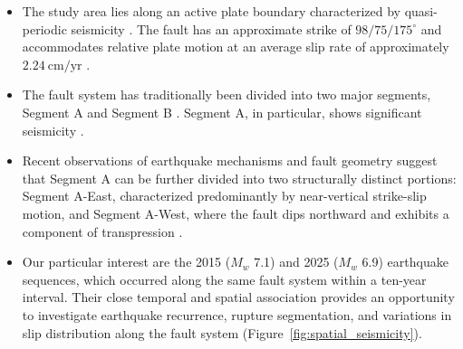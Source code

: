 \begin{itemize}


    \item The study area lies along an active plate boundary characterized by quasi-periodic seismicity \cite{Aderhold2016}. The fault has an approximate 
    strike of $98/75/175^\circ$ and accommodates relative plate motion at an average slip rate of approximately $2.24~\mathrm{cm/yr}$ \cite{Aderhold2016,DeMets1990}.

    \item The fault system has traditionally been divided into two major segments, Segment A and Segment B \cite{Searle1981,Whitmarsh1986,Skolotnev2021}.
     Segment A, in particular, shows significant seismicity \cite{Aderhold2016}.

    \item Recent observations of earthquake mechanisms and fault geometry suggest that Segment A can be further divided into two structurally distinct portions: 
    Segment A-East, characterized predominantly by near-vertical strike-slip motion, and Segment A-West, where the fault dips northward and exhibits a component
     of transpression \cite{Janin2026}.

    \item Our particular interest are the 2015 ($M_w$ 7.1) and 2025 ($M_w$ 6.9) earthquake sequences, which occurred along the same fault system within a ten-year interval. Their close 
    temporal and spatial association provides an opportunity to investigate earthquake recurrence, rupture segmentation, and variations in slip distribution along 
    the fault system (Figure~\ref{fig:spatial_seismicity}).


\end{itemize}

